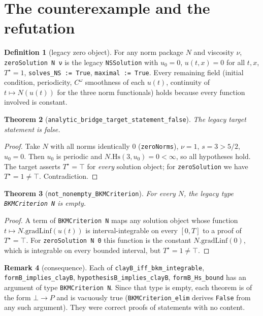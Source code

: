 \documentclass[11pt]{article}
\newtheorem{theorem}{Theorem}
\theoremstyle{definition}
\newtheorem{definition}[theorem]{Definition}
\newtheorem{remark}[theorem]{Remark}
\newcommand{\Tstar}{T^\star}
\newcommand{\lean}[1]{\texttt{#1}}
\begin{document}
\section{The counterexample and the refutation}

\begin{definition}[legacy zero object]
For any norm package $N$ and viscosity $\nu$, \lean{zeroSolution N ν} is the legacy
\lean{NSSolution} with $u_0 = 0$, $u(t,x) = 0$ for all $t,x$, $\Tstar = 1$,
\lean{solves\_NS := True}, \lean{maximal := True}. Every remaining field
(initial condition, periodicity, $C^\omega$ smoothness of each $u(t)$, continuity of
$t\mapsto N(u(t))$ for the three norm functionals) holds because every function involved
is constant.
\end{definition}

\begin{theorem}[\lean{analytic\_bridge\_target\_statement\_false}]
The legacy target statement is false.
\end{theorem}
\begin{proof}
Take $N$ with all norms identically $0$ (\lean{zeroNorms}), $\nu = 1$, $s = 3 > 5/2$,
$u_0 = 0$. Then $u_0$ is periodic and $N.\mathrm{Hs}(3,u_0) = 0 < \infty$, so all
hypotheses hold. The target asserts $\Tstar = \top$ for \emph{every} solution object; for
\lean{zeroSolution} we have $\Tstar = 1 \neq \top$. Contradiction.
\end{proof}

\begin{theorem}[\lean{not\_nonempty\_BKMCriterion}]
For every $N$, the legacy type \lean{BKMCriterion N} is empty.
\end{theorem}
\begin{proof}
A term of \lean{BKMCriterion N} maps any solution object whose function
$t \mapsto N.\mathrm{gradLinf}(u(t))$ is interval-integrable on every $[0,T]$ to a
proof of $\Tstar = \top$. For \lean{zeroSolution N 0} this function is the constant
$N.\mathrm{gradLinf}(0)$, which is integrable on every bounded interval, but
$\Tstar = 1 \ne \top$.
\end{proof}

\begin{remark}[consequence]
Each of \lean{clayB\_iff\_bkm\_integrable}, \lean{formB\_implies\_clayB},
\lean{hypothesisB\_implies\_clayB}, \lean{formB\_Hs\_bound} has an argument of type
\lean{BKMCriterion N}. Since that type is empty, each theorem is of the form
$\bot \to P$ and is vacuously true (\lean{BKMCriterion\_elim} derives \lean{False} from
any such argument). They were correct proofs of statements with no content.
\end{remark}
\end{document}
